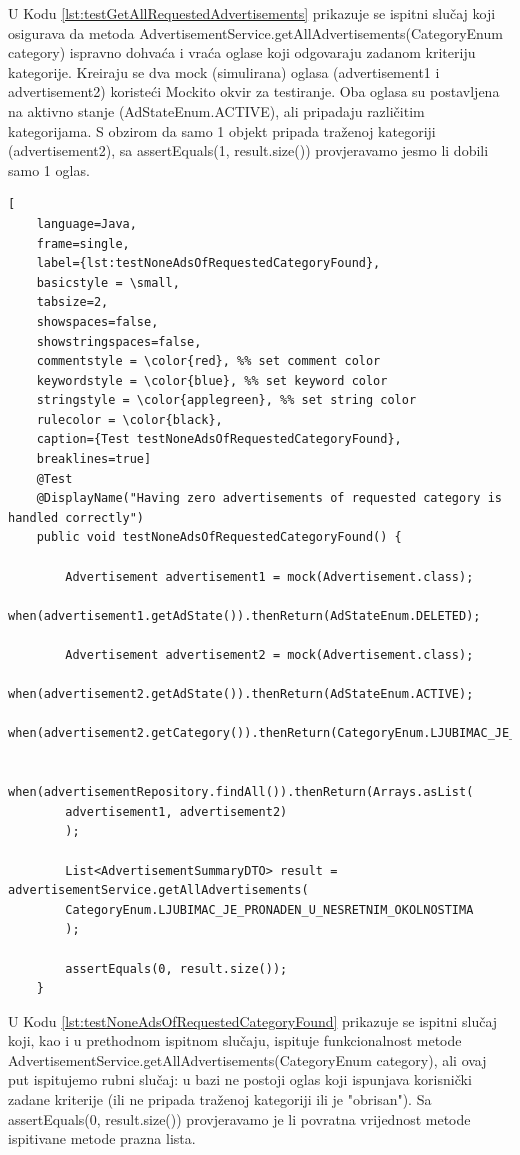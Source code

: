 U Kodu \ref{lst:testGetAllRequestedAdvertisements} prikazuje se ispitni slučaj koji osigurava da metoda AdvertisementService.getAllAdvertisements(CategoryEnum category) ispravno dohvaća i vraća oglase koji odgovaraju zadanom kriteriju kategorije. Kreiraju se dva mock (simulirana) oglasa (advertisement1 i advertisement2) koristeći Mockito okvir za testiranje. Oba oglasa su postavljena na aktivno stanje (AdStateEnum.ACTIVE), ali pripadaju različitim kategorijama. S obzirom da samo 1 objekt pripada traženoj kategoriji (advertisement2), sa assertEquals(1, result.size()) provjeravamo jesmo li dobili samo 1 oglas.

\pagebreak

\begin{lstlisting}[
	language=Java,
	frame=single,
	label={lst:testNoneAdsOfRequestedCategoryFound},
	basicstyle = \small,
	tabsize=2,
	showspaces=false,
	showstringspaces=false,
	commentstyle = \color{red}, %% set comment color
	keywordstyle = \color{blue}, %% set keyword color
	stringstyle = \color{applegreen}, %% set string color
	rulecolor = \color{black},
	caption={Test testNoneAdsOfRequestedCategoryFound},
	breaklines=true]
	@Test
	@DisplayName("Having zero advertisements of requested category is handled correctly")
	public void testNoneAdsOfRequestedCategoryFound() {
		
		Advertisement advertisement1 = mock(Advertisement.class);
		when(advertisement1.getAdState()).thenReturn(AdStateEnum.DELETED);
		
		Advertisement advertisement2 = mock(Advertisement.class);
		when(advertisement2.getAdState()).thenReturn(AdStateEnum.ACTIVE);
		when(advertisement2.getCategory()).thenReturn(CategoryEnum.LJUBIMAC_JE_SRETNO_PRONADEN);
		
		when(advertisementRepository.findAll()).thenReturn(Arrays.asList(
		advertisement1, advertisement2)
		);
		
		List<AdvertisementSummaryDTO> result = advertisementService.getAllAdvertisements(
		CategoryEnum.LJUBIMAC_JE_PRONADEN_U_NESRETNIM_OKOLNOSTIMA
		);
		
		assertEquals(0, result.size());
	}
\end{lstlisting}

U Kodu \ref{lst:testNoneAdsOfRequestedCategoryFound} prikazuje se ispitni slučaj koji, kao i u prethodnom ispitnom slučaju, ispituje funkcionalnost metode  AdvertisementService.getAllAdvertisements(CategoryEnum category), ali ovaj put ispitujemo rubni slučaj: u bazi ne postoji oglas koji ispunjava korisnički zadane kriterije (ili ne pripada traženoj kategoriji ili je "obrisan"). Sa assertEquals(0, result.size()) provjeravamo je li povratna vrijednost metode ispitivane metode prazna lista. 

